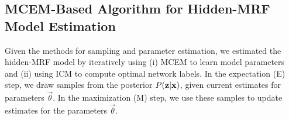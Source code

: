 \documentclass[runningheads, a4paper]{llncs}
\begin{document}


\subsection{MCEM-Based Algorithm for Hidden-MRF Model Estimation}

Given the methods for sampling and parameter estimation, we estimated
the hidden-MRF model by iteratively using (i) MCEM to learn model
parameters and (ii) using ICM to compute optimal network labels. In the
expectation (E) step, we draw samples from the posterior $P(\text{\bf z} |
\text{\bf x})$, given current estimates for parameters $\vec \theta$. In the
maximization (M) step, we use these samples to update estimates for
the parameters $\vec \theta$.
\end{document}

